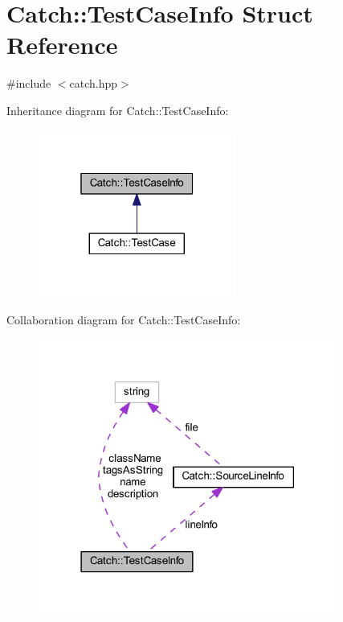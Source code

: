 \hypertarget{struct_catch_1_1_test_case_info}{}\section{Catch\+:\+:Test\+Case\+Info Struct Reference}
\label{struct_catch_1_1_test_case_info}


{\ttfamily \#include $<$catch.\+hpp$>$}



Inheritance diagram for Catch\+:\+:Test\+Case\+Info\+:\nopagebreak
\begin{figure}[H]
\begin{center}
\leavevmode
\includegraphics[width=184pt]{struct_catch_1_1_test_case_info__inherit__graph}
\end{center}
\end{figure}


Collaboration diagram for Catch\+:\+:Test\+Case\+Info\+:\nopagebreak
\begin{figure}[H]
\begin{center}
\leavevmode
\includegraphics[width=278pt]{struct_catch_1_1_test_case_info__coll__graph}
\end{center}
\end{figure}
